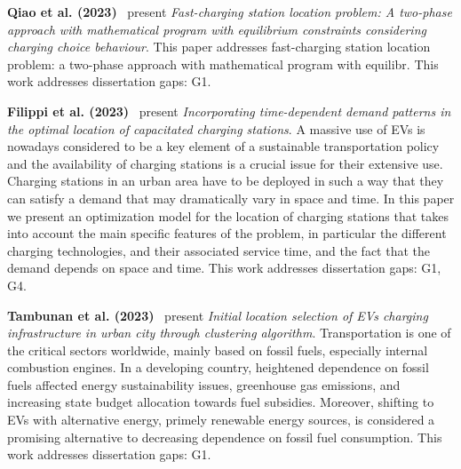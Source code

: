 \documentclass[letterpaper, 12pt, oneside, doublespacing]{Thesis}
\begin{document}
\noindent \textbf{Qiao et al. (2023)}~\cite{fast-charging_station_2023} present \textit{Fast-charging station location problem: A two-phase approach with mathematical program with equilibrium constraints considering charging choice behaviour}. This paper addresses fast-charging station location problem: a two-phase approach with mathematical program with equilibr. This work addresses dissertation gaps: G1.



\noindent \textbf{Filippi et al. (2023)}~\cite{incorporating_time-dependent_2023} present \textit{Incorporating time-dependent demand patterns in the optimal location of capacitated charging stations}. A massive use of EVs is nowadays considered to be a key element of a sustainable transportation policy and the availability of charging stations is a crucial issue for their extensive use. Charging stations in an urban area have to be deployed in such a way that they can satisfy a demand that may dramatically vary in space and time. In this paper we present an optimization model for the location of charging stations that takes into account the main specific features of the problem, in particular the different charging technologies, and their associated service time, and the fact that the demand depends on space and time. This work addresses dissertation gaps: G1, G4.



\noindent \textbf{Tambunan et al. (2023)}~\cite{initial_location_2023} present \textit{Initial location selection of EVs charging infrastructure in urban city through clustering algorithm}. Transportation is one of the critical sectors worldwide, mainly based on fossil fuels, especially internal combustion engines. In a developing country, heightened dependence on fossil fuels affected energy sustainability issues, greenhouse gas emissions, and increasing state budget allocation towards fuel subsidies. Moreover, shifting to EVs with alternative energy, primely renewable energy sources, is considered a promising alternative to decreasing dependence on fossil fuel consumption. This work addresses dissertation gaps: G1.
\end{document}
